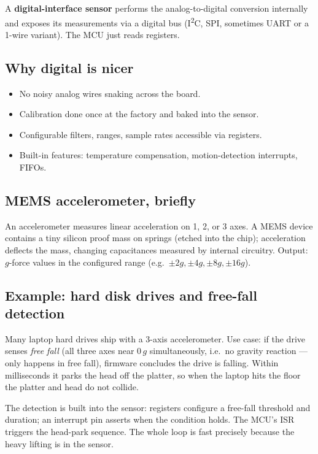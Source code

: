 \documentclass[11pt,a4paper]{article}
\begin{document}
A \textbf{digital-interface sensor} performs the analog-to-digital
conversion internally and exposes its measurements via a digital bus
(I\textsuperscript{2}C, SPI, sometimes UART or a 1-wire variant). The MCU
just reads registers.

\subsection{Why digital is nicer}

\begin{itemize}[leftmargin=*]
    \item No noisy analog wires snaking across the board.
    \item Calibration done once at the factory and baked into the sensor.
    \item Configurable filters, ranges, sample rates accessible via
    registers.
    \item Built-in features: temperature compensation, motion-detection
    interrupts, FIFOs.
\end{itemize}

\subsection{MEMS accelerometer, briefly}

An accelerometer measures linear acceleration on 1, 2, or 3 axes. A MEMS
device contains a tiny silicon proof mass on springs (etched into the
chip); acceleration deflects the mass, changing capacitances measured by
internal circuitry. Output: $g$-force values in the configured range
(e.g.\ $\pm 2g, \pm 4g, \pm 8g, \pm 16g$).

\subsection{Example: hard disk drives and free-fall detection}

Many laptop hard drives ship with a 3-axis accelerometer. Use case: if
the drive senses \emph{free fall} (all three axes near 0\,$g$
simultaneously, i.e.\ no gravity reaction --- only happens in free fall),
firmware concludes the drive is falling. Within milliseconds it parks the
head off the platter, so when the laptop hits the floor the platter and
head do not collide.

The detection is built into the sensor: registers configure a free-fall
threshold and duration; an interrupt pin asserts when the condition
holds. The MCU's ISR triggers the head-park sequence. The whole loop is
fast precisely because the heavy lifting is in the sensor.
\end{document}
